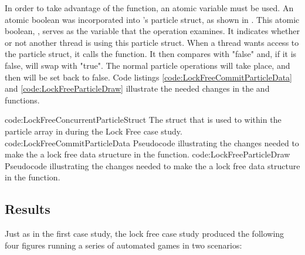 In order to take advantage of the  function, an atomic variable must be used. An atomic boolean was incorporated into 's particle struct, as shown in . This atomic boolean, , serves as the variable that the  operation examines. It indicates whether or not another thread is using this particle struct. When a thread wants access to the particle struct, it calls the  function. It then compares  with "false" and, if it is false, will swap  with "true". The normal particle operations will take place, and then  will be set back to false. Code listings \ref{code:LockFreeCommitParticleData} and \ref{code:LockFreeParticleDraw} illustrate the needed changes in the  and  functions.

\vspace{-0.5cm}
{code:LockFreeConcurrentParticleStruct}
{The struct that is used to within the particle array in  during the Lock Free case study.}
\vspace{-1.5cm}
{code:LockFreeCommitParticleData}
{Pseudocode illustrating the changes needed to make the  a lock free data structure in the  function.}
\vspace{-1.5cm}
{code:LockFreeParticleDraw}
{Pseudocode illustrating the changes needed to make the  a lock free data structure in the  function.}
\vspace{-0.5cm}

\subsection{Results}\label{ssec:studies_lock_free_results}

Just as in the first case study, the lock free case study produced the following four figures running a series of automated games in two scenarios: 


